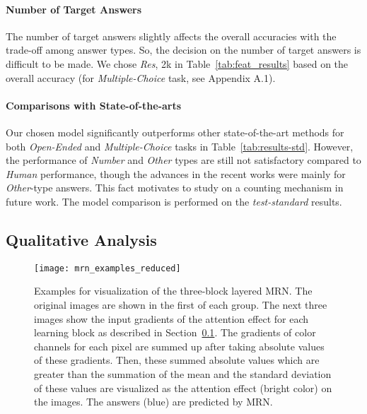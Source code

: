 \documentclass{article}
\begin{document}
\paragraph{Number of Target Answers} The number of target answers slightly affects the overall accuracies with the trade-off among answer types. So, the decision on the number of target answers is difficult to be made. We chose \textit{Res}, 2k in Table~\ref{tab:feat_results} based on the overall accuracy (for \textit{Multiple-Choice} task, see Appendix A.1).

\paragraph{Comparisons with State-of-the-arts} Our chosen model significantly outperforms other state-of-the-art methods for both \textit{Open-Ended} and \textit{Multiple-Choice} tasks in Table~\ref{tab:results-std}. However, the performance of \textit{Number} and \textit{Other} types are still not satisfactory compared to \textit{Human} performance, though the advances in the recent works were mainly for \textit{Other}-type answers. This fact motivates to study on a counting mechanism in future work. The model comparison is performed on the \textit{test-standard} results.

\subsection{Qualitative Analysis}
\label{subsec:visualization}

\begin{figure}[t!]
\centering
\texttt{[image: mrn\_examples\_reduced]}
\caption{Examples for visualization of the three-block layered MRN. The original images are shown in the first of each group. The next three images show the input gradients of the attention effect for each learning block as described in Section~\ref{subsec:visualization}. The gradients of color channels for each pixel are summed up after taking absolute values of these gradients. Then, these summed absolute values which are greater than the summation of the mean and the standard deviation of these values are visualized as the attention effect (bright color) on the images. The answers (blue) are predicted by MRN.}
\label{fig:examples}
\end{figure} 
\end{document}
